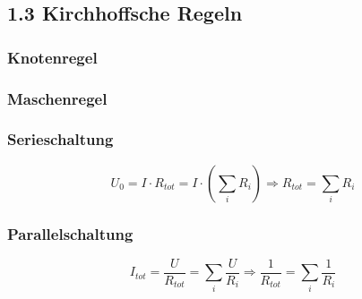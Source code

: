 \subsection*{1.3 Kirchhoffsche Regeln}
    \subsubsection*{Knotenregel}

    \subsubsection*{Maschenregel}

    \subsubsection*{Serieschaltung}
    \[
        U_0 = I \cdot R_{tot} = I \cdot \left(\sum\limits_i R_i\right) \Rightarrow \boxed{R_{tot} = \sum\limits_i R_i}
    \]

    \subsubsection*{Parallelschaltung}
    \[
        I_{tot} = \frac{U}{R_{tot}} = \sum\limits_i \frac{U}{R_i} \Rightarrow \boxed{\frac{1}{R_{tot}} = \sum\limits_i \frac{1}{R_i}}
    \]